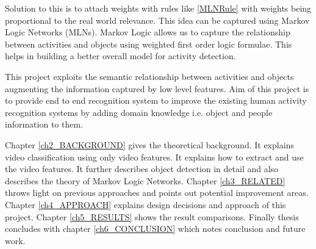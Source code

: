 Solution to this is to attach weights with rules like \eqref{MLNRule} with weights being proportional to the real world relevance.
This idea can be captured using Markov Logic Networks (MLNs). Markov Logic allows us 
to capture the relationship between activities and objects using weighted first order logic formulae.
This helps in building a better overall model for activity detection.


This project exploits the semantic relationship between activities and objects
augmenting the information captured by low level features. 
Aim of this project is to provide end to end recognition system to improve 
the existing human activity recognition systems
by adding domain knowledge i.e. object and people information to them.



Chapter \ref{ch2_BACKGROUND} gives the theoretical background. It explains video classification using only video features. It explains how to extract and use the video features. 
It further describes object detection in detail and also describes the theory of Markov Logic Networks. 
Chapter \ref{ch3_RELATED} throws light on previous approaches and points out potential improvement areas.
Chapter \ref{ch4_APPROACH} explains design decisions and approach of this project.
Chapter \ref{ch5_RESULTS} shows the result comparisons.
Finally thesis concludes with chapter \ref{ch6_CONCLUSION} which notes conclusion and future work.
